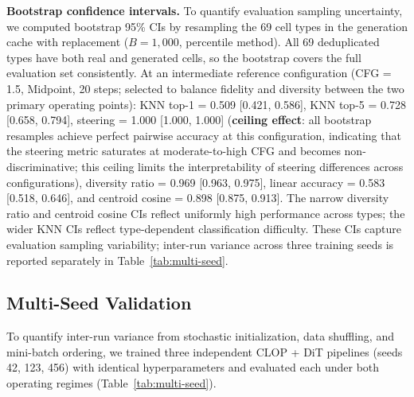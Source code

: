 \documentclass[biology,article,submit,pdftex,moreauthors]{Definitions/mdpi}
\begin{document}
\textbf{Bootstrap confidence intervals.} To quantify evaluation sampling uncertainty, we computed bootstrap 95\% CIs by resampling the 69 cell types in the generation cache with replacement ($B{=}1{,}000$, percentile method). All 69 deduplicated types have both real and generated cells, so the bootstrap covers the full evaluation set consistently. At an intermediate reference configuration (CFG = 1.5, Midpoint, 20 steps; selected to balance fidelity and diversity between the two primary operating points): KNN top-1 = 0.509 [0.421, 0.586], KNN top-5 = 0.728 [0.658, 0.794], steering = 1.000 [1.000, 1.000] (\textbf{ceiling effect}: all bootstrap resamples achieve perfect pairwise accuracy at this configuration, indicating that the steering metric saturates at moderate-to-high CFG and becomes non-discriminative; this ceiling limits the interpretability of steering differences across configurations), diversity ratio = 0.969 [0.963, 0.975], linear accuracy = 0.583 [0.518, 0.646], and centroid cosine = 0.898 [0.875, 0.913]. The narrow diversity ratio and centroid cosine CIs reflect uniformly high performance across types; the wider KNN CIs reflect type-dependent classification difficulty. These CIs capture evaluation sampling variability; inter-run variance across three training seeds is reported separately in Table~\ref{tab:multi-seed}.

\subsection{Multi-Seed Validation}\label{sec:multi-seed-results}

To quantify inter-run variance from stochastic initialization, data shuffling, and mini-batch ordering, we trained three independent CLOP + DiT pipelines (seeds 42, 123, 456) with identical hyperparameters and evaluated each under both operating regimes (Table~\ref{tab:multi-seed}).
\end{document}
